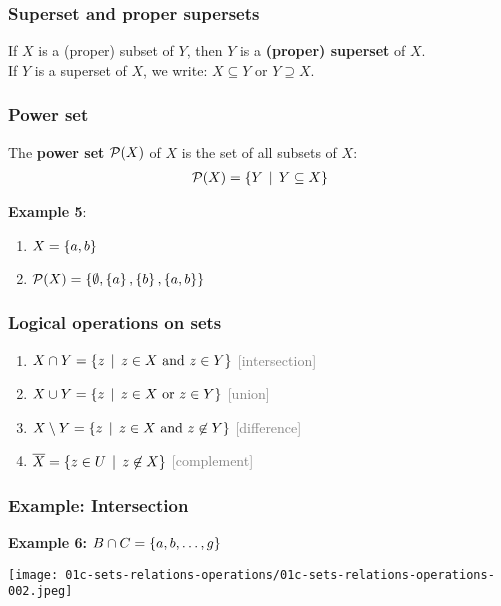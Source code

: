 \documentclass[fleqn,10pt,serif,xcolor=svgnames,xcolor=table,aspectratio=169]{beamer}
\newcommand{\mygray}[1]{\textcolor{gray}{#1}}
\begin{document}
\begin{frame}
  \frametitle{Superset and proper supersets}
  If $X$ is a (proper) subset of $Y$, then $Y$ is a \textbf{(proper) superset} of $X$.\\
  If $Y$ is a superset of $X$, we write: $X \subseteq Y$ or $Y \supseteq X$.
\end{frame}

\begin{frame}

\frametitle{Power set}

  The \textbf{power set} $\mathcal{P}(X)$ of $X$ is the set of all subsets of $X$:
  \begin{align*}
    \mathcal{P}(X) = \left\{Y \thinspace \mid \thinspace Y \subseteq X\right\}
  \end{align*}

  \bigskip

  \textbf{Example 5}:

    \begin{enumerate}[]
      \item $X = \left\{a,b\right\}$
      \item $\mathcal{P}(X) = \left\{\emptyset, \left\{a\right\}, \left\{b\right\}, \left\{a,b\right\}\right\}$
    \end{enumerate}

\end{frame}

\begin{frame}
  \frametitle{Logical operations on sets}
\begin{enumerate}[]
\item $X \cap Y = \left\{z \thinspace \mid \thinspace z \in X \text{ and } z \in Y\right\}$ \hfill \mygray{[intersection]}
\item $X \cup Y = \left\{z \thinspace \mid \thinspace z \in X \text{ or } z \in Y\right\}$ \hfill \mygray{[union]}
\item $X \setminus Y = \left\{z \thinspace \mid \thinspace z \in X \text{ and } z \not \in Y\right\}$ \hfill
  \mygray{[difference]}
\item $\overline{X} = \left\{z \in U \thinspace \mid \thinspace z \not \in X \right\}$ \hfill
  \mygray{[complement]}
\end{enumerate}

\end{frame}

\begin{frame}
  \frametitle{Example: Intersection}

  \hfill \textbf{Example 6: $B \cap C = \left\{a, b , \dots, g\right\}$}

  \bigskip

  \hfill \texttt{[image: 01c-sets-relations-operations/01c-sets-relations-operations-002.jpeg]}

\end{frame}
\end{document}
